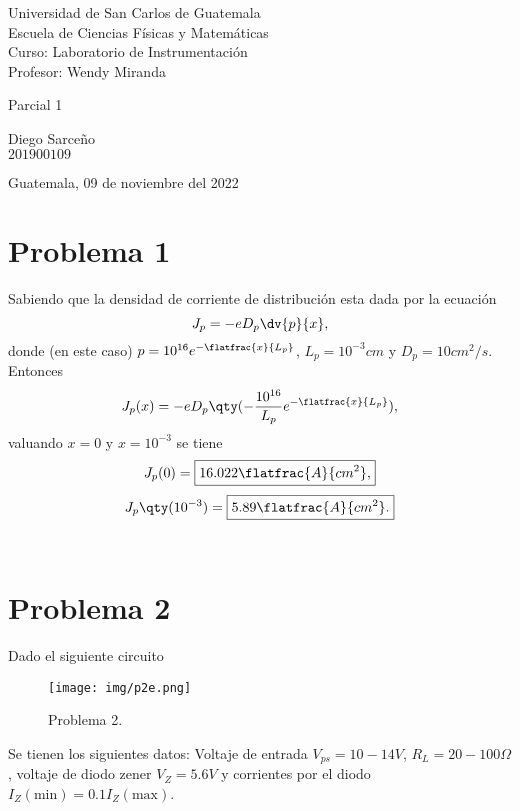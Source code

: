 \documentclass[conference]{IEEEtran}
\begin{document}
\begin{titlepage}



\begin{flushleft}
    Universidad de San Carlos de Guatemala \\
    Escuela de Ciencias Físicas y Matemáticas \\
    Curso: Laboratorio de Instrumentación \\
    Profesor: Wendy Miranda
\end{flushleft}

\vspace{8cm}

\begin{center}
    \huge{Parcial 1}
\end{center}

\vspace{10cm}

\begin{flushright}
    Diego Sarceño \\
    $201900109$
\end{flushright}

\vspace{0.5cm}

\begin{center}
    Guatemala, 09 de noviembre del 2022
\end{center}

\end{titlepage}



\section{Problema 1}
Sabiendo que la densidad de corriente de distribución esta dada por la ecuación
	$$ J_p = -eD_p \dv{p}{x}, $$
donde (en este caso) $p = 10^{16} e^{-\flatfrac{x}{L_p}}$, $L_p = 10^{-3} cm$ y $D_p = 10cm^2/s$. Entonces
	$$ J_p (x) = -eD_p \qty(-\frac{10^{16}}{L_p} e^{-\flatfrac{x}{L_p}}), $$
valuando $x = 0$ y $x = 10^{-3}$ se tiene
	$$ J_p (0) = \boxed{16.022 \flatfrac{A}{cm^2},} $$
	$$ J_p \qty(10^{-3}) = \boxed{5.89 \flatfrac{A}{cm^2}.} $$ \\
\section{Problema 2}
Dado el siguiente circuito
\begin{figure}[H]
	\centering
	\texttt{[image: img/p2e.png]}
	\caption{Problema 2.}
	\label{p2e}
\end{figure}
Se tienen los siguientes datos: Voltaje de entrada $V_{ps} = 10-14V$, $R_L = 20-100\Omega$, voltaje de diodo zener $V_Z = 5.6V$ y corrientes por el diodo $I_Z (\text{min}) = 0.1 I_Z (\text{max})$. \\\\
\end{document}
